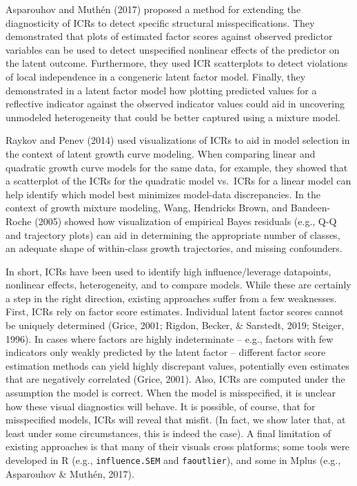 \documentclass[
  english,
  doc]{apa6}
\begin{document}
Asparouhov and Muthén (2017) proposed a method for extending the diagnosticity of ICRs to detect specific structural misspecifications. They demonstrated that plots of estimated factor scores against observed predictor variables can be used to detect unspecified nonlinear effects of the predictor on the latent outcome. Furthermore, they used ICR scatterplots to detect violations of local independence in a congeneric latent factor model. Finally, they demonstrated in a latent factor model how plotting predicted values for a reflective indicator against the observed indicator values could aid in uncovering unmodeled heterogeneity that could be better captured using a mixture model.

Raykov and Penev (2014) used visualizations of ICRs to aid in model selection in the context of latent growth curve modeling. When comparing linear and quadratic growth curve models for the same data, for example, they showed that a scatterplot of the ICRs for the quadratic model vs.~ICRs for a linear model can help identify which model best minimizes model-data discrepancies. In the context of growth mixture modeling, Wang, Hendricks Brown, and Bandeen-Roche (2005) showed how visualization of empirical Bayes residuals (e.g., Q-Q and trajectory plots) can aid in determining the appropriate number of classes, an adequate shape of within-class growth trajectories, and missing confounders.

In short, ICRs have been used to identify high influence/leverage datapoints, nonlinear effects, heterogeneity, and to compare models. While these are certainly a step in the right direction, existing approaches suffer from a few weaknesses. First, ICRs rely on factor score estimates. Individual latent factor scores cannot be uniquely determined (Grice, 2001; Rigdon, Becker, \& Sarstedt, 2019; Steiger, 1996). In cases where factors are highly indeterminate -- e.g., factors with few indicators only weakly predicted by the latent factor -- different factor score estimation methods can yield highly discrepant values, potentially even estimates that are negatively correlated (Grice, 2001). Also, ICRs are computed under the assumption the model is correct. When the model is misspecified, it is unclear how these visual diagnostics will behave. It is possible, of course, that for misspecified models, ICRs will reveal that misfit. (In fact, we show later that, at least under some circumstances, this is indeed the case). A final limitation of existing approaches is that many of their visuals cross platforms; some tools were developed in R (e.g., \texttt{influence.SEM} and \texttt{faoutlier}), and some in Mplus (e.g., Asparouhov \& Muthén, 2017).
\end{document}
